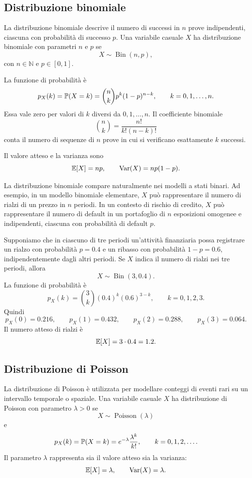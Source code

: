 \subsection{Distribuzione binomiale}

La distribuzione binomiale descrive il numero di successi in $n$ prove
indipendenti, ciascuna con probabilit\`{a} di successo $p$. Una variabile casuale
$X$ ha distribuzione binomiale con parametri $n$ e $p$ se
\[
X\sim \operatorname{Bin}(n,p),
\]
con $n\in\mathbb{N}$ e $p\in[0,1]$.

La funzione di probabilit\`{a} \`{e}
\[
p_X(k)
=
\mathbb{P}(X=k)
=
\binom{n}{k}p^k(1-p)^{n-k},
\qquad
k=0,1,\ldots,n.
\]
Essa vale zero per valori di $k$ diversi da $0,1,\ldots,n$. Il coefficiente
binomiale
\[
\binom{n}{k}
=
\frac{n!}{k!(n-k)!}
\]
conta il numero di sequenze di $n$ prove in cui si verificano esattamente $k$
successi.

Il valore atteso e la varianza sono
\[
\mathbb{E}[X]=np,
\qquad
\operatorname{Var}(X)=np(1-p).
\]

La distribuzione binomiale compare naturalmente nei modelli a stati binari. Ad
esempio, in un modello binomiale elementare, $X$ pu\`{o} rappresentare il numero
di rialzi di un prezzo in $n$ periodi. In un contesto di rischio di credito, $X$
pu\`{o} rappresentare il numero di default in un portafoglio di $n$ esposizioni
omogenee e indipendenti, ciascuna con probabilit\`{a} di default $p$.

\begin{example}
Supponiamo che in ciascuno di tre periodi un'attivit\`{a} finanziaria possa
registrare un rialzo con probabilit\`{a} $p=0.4$ e un ribasso con probabilit\`{a}
$1-p=0.6$, indipendentemente dagli altri periodi. Se $X$ indica il numero di
rialzi nei tre periodi, allora
\[
X\sim \operatorname{Bin}(3,0.4).
\]
La funzione di probabilit\`{a} \`{e}
\[
p_X(k)=\binom{3}{k}(0.4)^k(0.6)^{3-k},
\qquad k=0,1,2,3.
\]
Quindi
\[
p_X(0)=0.216,
\qquad
p_X(1)=0.432,
\qquad
p_X(2)=0.288,
\qquad
p_X(3)=0.064.
\]
Il numero atteso di rialzi \`{e}
\[
\mathbb{E}[X]=3\cdot 0.4=1.2.
\]
\end{example}

\subsection{Distribuzione di Poisson}

La distribuzione di Poisson \`{e} utilizzata per modellare conteggi di eventi
rari su un intervallo temporale o spaziale. Una variabile casuale $X$ ha
distribuzione di Poisson con parametro $\lambda>0$ se
\[
X\sim \operatorname{Poisson}(\lambda)
\]
e
\[
p_X(k)
=
\mathbb{P}(X=k)
=
e^{-\lambda}\frac{\lambda^k}{k!},
\qquad
k=0,1,2,\ldots.
\]
Il parametro $\lambda$ rappresenta sia il valore atteso sia la varianza:
\[
\mathbb{E}[X]=\lambda,
\qquad
\operatorname{Var}(X)=\lambda.
\]

